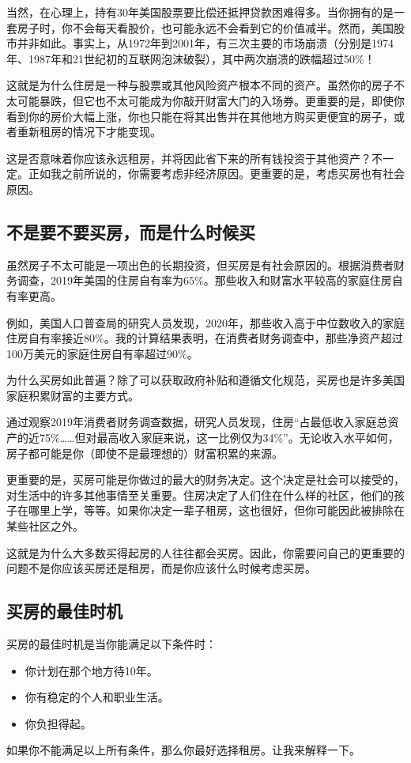 当然，在心理上，持有30年美国股票要比偿还抵押贷款困难得多。当你拥有的是一套房子时，你不会每天看股价，也可能永远不会看到它的价值减半。然而，美国股市并非如此。事实上，从1972年到2001年，有三次主要的市场崩溃（分别是1974年、1987年和21世纪初的互联网泡沫破裂），其中两次崩溃的跌幅超过50\%！

这就是为什么住房是一种与股票或其他风险资产根本不同的资产。虽然你的房子不太可能暴跌，但它也不太可能成为你敲开财富大门的入场券。更重要的是，即使你看到你的房价大幅上涨，你也只能在将其出售并在其他地方购买更便宜的房子，或者重新租房的情况下才能变现。

这是否意味着你应该永远租房，并将因此省下来的所有钱投资于其他资产？不一定。正如我之前所说的，你需要考虑非经济原因。更重要的是，考虑买房也有社会原因。

\subsection{不是要不要买房，而是什么时候买}
虽然房子不太可能是一项出色的长期投资，但买房是有社会原因的。根据消费者财务调查，2019年美国的住房自有率为65\%。那些收入和财富水平较高的家庭住房自有率更高。

例如，美国人口普查局的研究人员发现，2020年，那些收入高于中位数收入的家庭住房自有率接近80\%。我的计算结果表明，在消费者财务调查中，那些净资产超过100万美元的家庭住房自有率超过90\%。

为什么买房如此普遍？除了可以获取政府补贴和遵循文化规范，买房也是许多美国家庭积累财富的主要方式。

通过观察2019年消费者财务调查数据，研究人员发现，住房“占最低收入家庭总资产的近75\%……但对最高收入家庭来说，这一比例仅为34\%”。无论收入水平如何，房子都可能是你（即使不是最理想的）财富积累的来源。

更重要的是，买房可能是你做过的最大的财务决定。这个决定是社会可以接受的，对生活中的许多其他事情至关重要。住房决定了人们住在什么样的社区，他们的孩子在哪里上学，等等。如果你决定一辈子租房，这也很好，但你可能因此被排除在某些社区之外。

这就是为什么大多数买得起房的人往往都会买房。因此，你需要问自己的更重要的问题不是你应该买房还是租房，而是你应该什么时候考虑买房。

\subsection{买房的最佳时机}
买房的最佳时机是当你能满足以下条件时：

\begin{itemize}
\item 你计划在那个地方待10年。
\item 你有稳定的个人和职业生活。
\item 你负担得起。
\end{itemize}
如果你不能满足以上所有条件，那么你最好选择租房。让我来解释一下。

